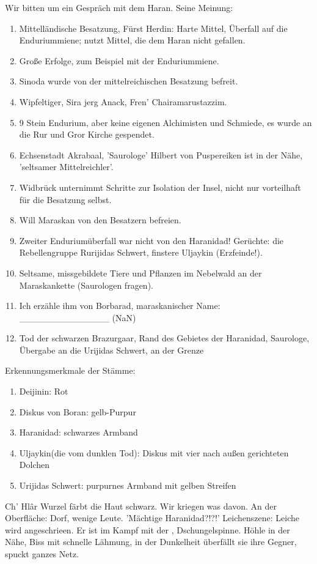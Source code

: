 Wir bitten um ein Gespräch mit dem Haran. Seine Meinung:
\begin{enumerate}
\item Mittelländische Besatzung, Fürst Herdin: Harte Mittel, Überfall auf die Enduriummiene; nutzt Mittel, die dem Haran nicht gefallen. 
\item Große Erfolge, zum Beispiel mit der Enduriummiene. 
\item Sinoda wurde von der mittelreichischen Besatzung befreit. 
\item Wipfeltiger, Sira jerg Anack, Fren' Chairamarustazzim. 
\item 9 Stein Endurium, aber keine eigenen Alchimisten und Schmiede, es wurde an die Rur und Gror Kirche gespendet. 
\item Echsenstadt Akrabaal, 'Saurologe' Hilbert von Puspereiken ist in der Nähe, 'seltsamer Mittelreichler'. 
\item Widbrück unternimmt Schritte zur Isolation der Insel, nicht nur vorteilhaft für die Besatzung selbst. 
\item Will Maraskan von den Besatzern befreien.
\item Zweiter Enduriumüberfall war nicht von den Haranidad! Gerüchte: die Rebellengruppe Rurijidas Schwert, finstere Uljaykin (Erzfeinde!).
\item Seltsame, missgebildete Tiere und Pflanzen im Nebelwald an der Maraskankette (Saurologen fragen). 
\item Ich erzähle ihm von Borbarad, maraskanischer Name: \_\_\_\_\_\_\_\_\_\_\_\_\_\_ (NaN)
\item Tod der schwarzen Brazurgaar, Rand des Gebietes der Haranidad, Saurologe, Übergabe an die Urijidas Schwert, an der Grenze 
\end{enumerate}

Erkennungsmerkmale der Stämme:
\begin{enumerate}
\item Deijinin: {\color{red}Rot}
\item Diskus von Boran: {\color{yellow}gelb}-{\color{purple}Purpur}
\item Haranidad: schwarzes Armband
\item Uljaykin(die vom dunklen Tod): Diskus mit vier nach außen gerichteten Dolchen
\item Urijidas Schwert: {\color{purple}purpurnes} Armband mit {\color{yellow}gelben} Streifen
\end{enumerate}
Ch' Hl\^ar Wurzel färbt die Haut schwarz. Wir kriegen was davon. An der Oberfläche: Dorf, wenige Leute. 'Mächtige Haranidad?!?!' Leichenszene: Leiche wird angeschrieen. Er ist im Kampf mit der , Dschungelspinne. Höhle in der Nähe, Biss mit schnelle Lähmung, in der Dunkelheit überfällt sie ihre Gegner, spuckt ganzes Netz.

